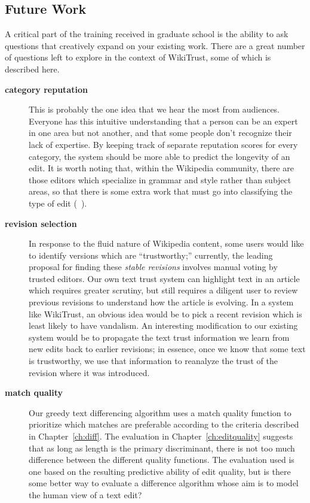 \subsection{Future Work}

A critical part of the training received in graduate school
is the ability to ask questions that creatively expand on your
existing work.
There are a great number of questions left to explore in the
context of WikiTrust, some of which is described here.

\begin{description}
\item[\textbf{category reputation}]
    This is probably the one idea that we hear the most from audiences.
    Everyone has this intuitive understanding that a person can be
    an expert in one area but not another, and that some people don't
    recognize their lack of expertise.
    By keeping track of separate reputation scores for every category,
    the system should be more able to predict the longevity of an edit.
    It is worth noting that, within the Wikipedia community, there
    are those editors which specialize in grammar and style rather than
    subject areas, so that there is some extra work that must go
    into classifying the type of edit (\eg~\cite{Fong2010}).

\item[\textbf{revision selection}]
   In response to the fluid nature of Wikipedia content,
    some users would like to identify versions which
    are ``trustworthy;'' currently, the leading proposal
    for finding these \textit{stable revisions}
    involves manual voting by trusted editors.
    Our own text trust system can highlight text in
    an article which requires greater scrutiny, but
    still requires a diligent user to review previous
    revisions to understand how the article is evolving.
    In a system like WikiTrust, an obvious idea would be to pick
    a recent revision which is least likely to have vandalism.
    An interesting modification to our existing system would be
    to propagate the text trust information we learn from new edits
    back to earlier revisions; in essence, once we know that some
    text is trustworthy, we use that information to reanalyze the
    trust of the revision where it was introduced.

\item[\textbf{match quality}] Our greedy text differencing algorithm
    uses a match quality function to prioritize which matches are
    preferable according to the criteria described in Chapter~\ref{ch:diff}.
    The evaluation in Chapter~\ref{ch:editquality}
    suggests that as long as length
    is the primary discriminant, there is not too much difference
    between the different quality functions.
    The evaluation used is one based on the resulting predictive ability
    of edit quality, but is there some better way to evaluate a difference
    algorithm whose aim is to model the human view of a text edit?


\end{description}
